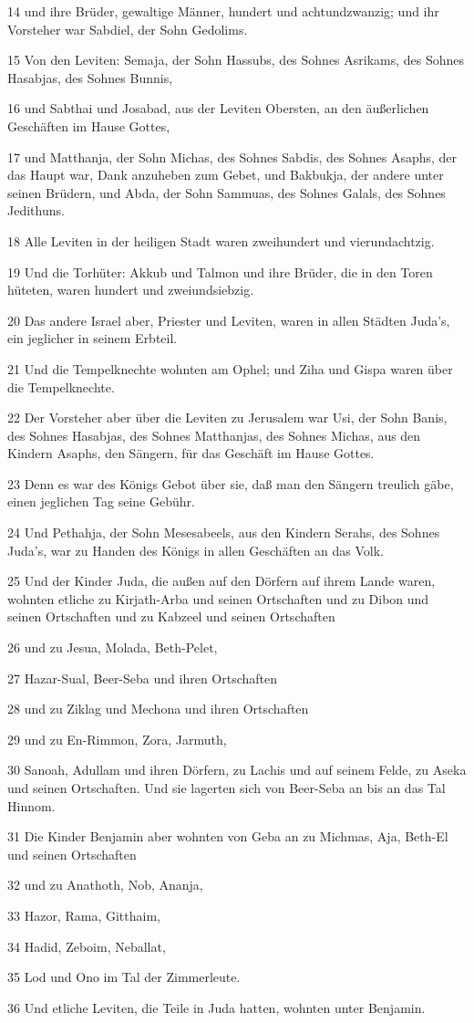 \par 14 und ihre Brüder, gewaltige Männer, hundert und achtundzwanzig; und ihr Vorsteher war Sabdiel, der Sohn Gedolims.
\par 15 Von den Leviten: Semaja, der Sohn Hassubs, des Sohnes Asrikams, des Sohnes Hasabjas, des Sohnes Bunnis,
\par 16 und Sabthai und Josabad, aus der Leviten Obersten, an den äußerlichen Geschäften im Hause Gottes,
\par 17 und Matthanja, der Sohn Michas, des Sohnes Sabdis, des Sohnes Asaphs, der das Haupt war, Dank anzuheben zum Gebet, und Bakbukja, der andere unter seinen Brüdern, und Abda, der Sohn Sammuas, des Sohnes Galals, des Sohnes Jedithuns.
\par 18 Alle Leviten in der heiligen Stadt waren zweihundert und vierundachtzig.
\par 19 Und die Torhüter: Akkub und Talmon und ihre Brüder, die in den Toren hüteten, waren hundert und zweiundsiebzig.
\par 20 Das andere Israel aber, Priester und Leviten, waren in allen Städten Juda's, ein jeglicher in seinem Erbteil.
\par 21 Und die Tempelknechte wohnten am Ophel; und Ziha und Gispa waren über die Tempelknechte.
\par 22 Der Vorsteher aber über die Leviten zu Jerusalem war Usi, der Sohn Banis, des Sohnes Hasabjas, des Sohnes Matthanjas, des Sohnes Michas, aus den Kindern Asaphs, den Sängern, für das Geschäft im Hause Gottes.
\par 23 Denn es war des Königs Gebot über sie, daß man den Sängern treulich gäbe, einen jeglichen Tag seine Gebühr.
\par 24 Und Pethahja, der Sohn Mesesabeels, aus den Kindern Serahs, des Sohnes Juda's, war zu Handen des Königs in allen Geschäften an das Volk.
\par 25 Und der Kinder Juda, die außen auf den Dörfern auf ihrem Lande waren, wohnten etliche zu Kirjath-Arba und seinen Ortschaften und zu Dibon und seinen Ortschaften und zu Kabzeel und seinen Ortschaften
\par 26 und zu Jesua, Molada, Beth-Pelet,
\par 27 Hazar-Sual, Beer-Seba und ihren Ortschaften
\par 28 und zu Ziklag und Mechona und ihren Ortschaften
\par 29 und zu En-Rimmon, Zora, Jarmuth,
\par 30 Sanoah, Adullam und ihren Dörfern, zu Lachis und auf seinem Felde, zu Aseka und seinen Ortschaften. Und sie lagerten sich von Beer-Seba an bis an das Tal Hinnom.
\par 31 Die Kinder Benjamin aber wohnten von Geba an zu Michmas, Aja, Beth-El und seinen Ortschaften
\par 32 und zu Anathoth, Nob, Ananja,
\par 33 Hazor, Rama, Gitthaim,
\par 34 Hadid, Zeboim, Neballat,
\par 35 Lod und Ono im Tal der Zimmerleute.
\par 36 Und etliche Leviten, die Teile in Juda hatten, wohnten unter Benjamin.

